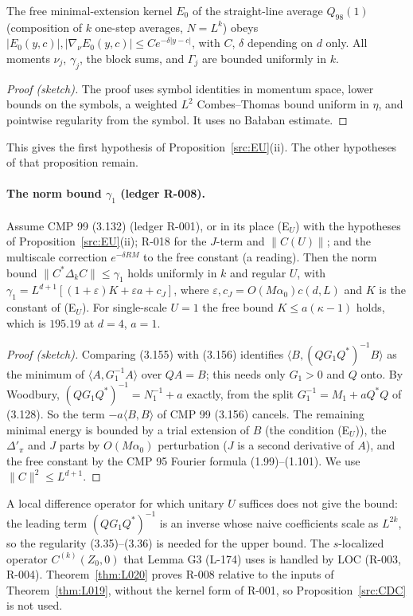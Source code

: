 \begin{proposition}\label{src:T2-EUMOM}
The free minimal-extension kernel $E_0$ of the straight-line average $Q_{98}(1)$ (composition of $k$ one-step averages, $N=L^k$) obeys $|E_0(y,c)|,|\nabla_\nu E_0(y,c)|\le Ce^{-\delta|y-c|}$, with $C$, $\delta$ depending on $d$ only. All moments $\nu_j$, $\gamma_j$, the block sums, and $\Gamma_j$ are bounded uniformly in $k$.
\end{proposition}
\begin{proof}[Proof (sketch)]
The proof uses symbol identities in momentum space, lower bounds on the symbols, a weighted $L^2$ Combes--Thomas bound uniform in $\eta$, and pointwise regularity from the symbol. It uses no Ba{\l}aban estimate.
\end{proof}
This gives the first hypothesis of Proposition~\ref{src:EU}(ii). The other hypotheses of that proposition remain.

\paragraph{The norm bound $\gamma_1$ (ledger R-008).}
\begin{proposition}\label{src:CDC}
Assume CMP 99 (3.132) (ledger R-001), or in its place (E$_U$) with the hypotheses of Proposition~\ref{src:EU}(ii); R-018 for the $J$-term and $\|C(U)\|$; and the multiscale correction $e^{-\delta RM}$ to the free constant (a reading). Then the norm bound $\|C^*\Delta_kC\|\le\gamma_1$ holds uniformly in $k$ and regular $U$, with $\gamma_1=L^{d+1}[(1+\varepsilon)K+\varepsilon a+c_J]$, where $\varepsilon,c_J=O(M\alpha_0)c(d,L)$ and $K$ is the constant of (E$_U$). For single-scale $U=1$ the free bound $K\le a(\kappa-1)$ holds, which is $195.19$ at $d=4$, $a=1$.
\end{proposition}
\begin{proof}[Proof (sketch)]
Comparing (3.155) with (3.156) identifies $\langle B,(QG_1Q^*)^{-1}B\rangle$ as the minimum of $\langle A,G_1^{-1}A\rangle$ over $QA=B$; this needs only $G_1>0$ and $Q$ onto. By Woodbury, $(QG_1Q^*)^{-1}=N_1^{-1}+a$ exactly, from the split $G_1^{-1}=M_1+aQ^*Q$ of (3.128). So the term $-a\langle B,B\rangle$ of CMP 99 (3.156) cancels. The remaining minimal energy is bounded by a trial extension of $B$ (the condition (E$_U$)), the $\Delta'_\pi$ and $J$ parts by $O(M\alpha_0)$ perturbation ($J$ is a second derivative of $A$), and the free constant by the CMP 95 Fourier formula (1.99)--(1.101). We use $\|C\|^2\le L^{d+1}$.
\end{proof}
A local difference operator for which unitary $U$ suffices does not give the bound: the leading term $(QG_1Q^*)^{-1}$ is an inverse whose naive coefficients scale as $L^{2k}$, so the regularity (3.35)--(3.36) is needed for the upper bound. The $s$-localized operator $C^{(k)}(Z_0,0)$ that Lemma G3 (L-174) uses is handled by LOC (R-003, R-004). Theorem~\ref{thm:L020} proves R-008 relative to the inputs of Theorem~\ref{thm:L019}, without the kernel form of R-001, so Proposition~\ref{src:CDC} is not used.
